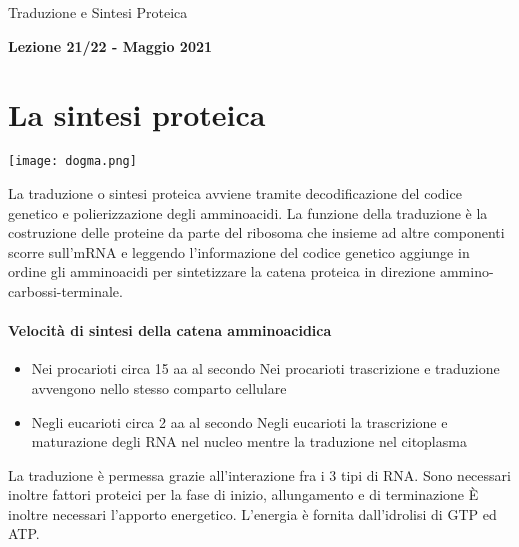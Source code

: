 \documentclass{article}
\begin{document}
\begin{titlepage}
    \begin{center}
        \vspace*{1cm}
        \huge
        Traduzione e Sintesi Proteica
            
        \vspace{1.5cm}
        
        \Large
        \textbf{Lezione 21/22 - Maggio 2021}

        \vspace{0.8cm}

    \end{center}
\end{titlepage}
\setcounter{page}{84}
\section{La sintesi proteica}
\begin{center}
    \texttt{[image: dogma.png]}
\end{center}
La traduzione o sintesi proteica avviene tramite decodificazione del codice genetico e polierizzazione degli amminoacidi.
La funzione della traduzione è la costruzione delle proteine da parte del ribosoma che insieme ad altre componenti scorre sull'mRNA
e leggendo l'informazione del codice genetico aggiunge in ordine gli amminoacidi per sintetizzare la catena proteica in
direzione ammino-carbossi-terminale.
\paragraph{Velocità di sintesi della catena amminoacidica}
\begin{itemize}
    \item Nei procarioti circa 15 aa al secondo
    \subitem Nei procarioti trascrizione e traduzione
    avvengono nello stesso comparto cellulare
    \item Negli eucarioti circa 2 aa al secondo
    \subitem Negli eucarioti la trascrizione e maturazione
    degli RNA nel nucleo mentre la traduzione nel
    citoplasma
\end{itemize}
La traduzione è permessa grazie all'interazione fra i 3 tipi di RNA.
Sono necessari inoltre fattori proteici per la fase di inizio, allungamento e di terminazione
È inoltre necessari l'apporto energetico. L'energia è fornita dall'idrolisi di GTP ed ATP.
\end{document}
